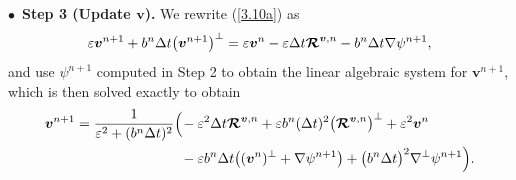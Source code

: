\documentclass[a4paper,11pt,twoside]{article}
\numberwithin{equation}{section}
\numberwithin{figure}{section}
\numberwithin{table}{section}
\newcommand{\eps}{\varepsilon}
\newcommand{\dt}{\Delta t}
\newcommand{\bv}{\bm{v}}
\newcommand\eref[1]{(\ref{#1})}
\begin{document}
\smallskip
\noindent
$\bullet\,$ \textbf{Step 3 (Update $\bv$).} We rewrite \eref{3.10a} as
\begin{equation}
\eps\bv^{n+1}+b^n\dt\big(\bv^{n+1}\big)^\perp=\eps\bv^n-\eps\dt\bm{{\cal R}}^{\bv,n}-b^n\dt\nabla\psi^{n+1},
\label{3.15}
\end{equation}
and use $\psi^{n+1}$ computed in Step 2 to obtain the linear algebraic system for $\bv^{n+1}$, which is then solved exactly to obtain
\begin{equation}
\begin{aligned}
\bv^{n+1}=\frac{1}{\eps^2+(b^n\dt)^2}\Big(\!&-\eps^2\dt\bm{{\cal R}}^{\bv,n}+\eps b^n(\dt)^2\big(\bm{{\cal R}}^{\bv,n}\big)^\perp+
\eps^2\bv^n\\
&-\eps b^n\dt\big((\bv^n)^\perp+\nabla\psi^{n+1}\big)+\big(b^n\dt\big)^2\nabla^\perp\psi^{n+1}\Big).
\end{aligned}
\label{3.16}
\end{equation}
\end{document}
